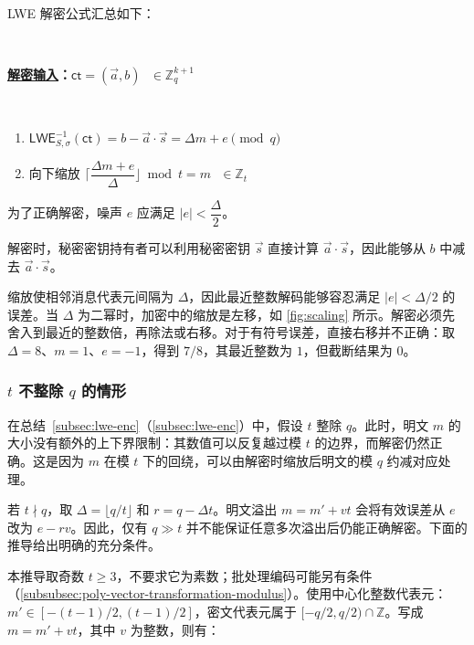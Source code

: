 $ $

LWE 解密公式汇总如下：

$ $

\begin{tcolorbox}[title={\textbf{\tboxlabel{\ref*{subsec:lwe-dec}} LWE 解密}}]

\textbf{\underline{解密输入}：}$\textsf{ct} = (\vec{a}, b) \text{ } \in \mathbb{Z}_q^{k+1}$

$ $

\begin{enumerate}
\item $\textsf{LWE}^{-1}_{S,\sigma}(\textsf{ct}) = b - \vec{a}\cdot \vec{s} = \Delta  m + e \pmod q$

\item 向下缩放 $\Bigg\lceil\dfrac{ \Delta  m + e } {\Delta}\Bigg\rfloor \bmod t = m \text{ } \in \mathbb{Z}_t$
\end{enumerate}

为了正确解密，噪声 $e$ 应满足 $|e| < \dfrac{\Delta}{2}$。

\end{tcolorbox}

解密时，秘密密钥持有者可以利用秘密密钥 $\vec{s}$ 直接计算 $\vec{a} \cdot \vec{s}$，因此能够从 $b$ 中减去 $\vec{a} \cdot \vec{s}$。

缩放使相邻消息代表元间隔为 $\Delta$，因此最近整数解码能够容忍满足 $|e|<\Delta/2$ 的误差。当 $\Delta$ 为二幂时，加密中的缩放是左移，如 \autoref{fig:scaling} 所示。解密必须先舍入到最近的整数倍，再除法或右移。对于有符号误差，直接右移并不正确：取 $\Delta=8$、$m=1$、$e=-1$，得到 $7/8$，其最近整数为 $1$，但截断结果为 $0$。

\subsubsection{$t$ 不整除 $q$ 的情形}
\label{subsubsec:lwe-noise-bound}

在总结~\ref*{subsec:lwe-enc}（\autoref{subsec:lwe-enc}）中，假设 $t$ 整除 $q$。此时，明文 $m$ 的大小没有额外的上下界限制：其数值可以反复越过模 $t$ 的边界，而解密仍然正确。这是因为 $m$
在模 $t$ 下的回绕，可以由解密时缩放后明文的模 $q$ 约减对应处理。

若 $t\nmid q$，取 $\Delta=\lfloor q/t\rfloor$ 和 $r=q-\Delta t$。明文溢出 $m=m'+vt$ 会将有效误差从 $e$ 改为 $e-rv$。因此，仅有 $q\gg t$ 并不能保证任意多次溢出后仍能正确解密。下面的推导给出明确的充分条件。

本推导取奇数 $t\ge3$，不要求它为素数；批处理编码可能另有条件（\autoref{subsubsec:poly-vector-transformation-modulus}）。使用中心化整数代表元：$m'\in[-(t-1)/2,(t-1)/2]$，密文代表元属于 $[-q/2,q/2)\cap\mathbb Z$。写成 $m=m'+vt$，其中 $v$ 为整数，则有：

